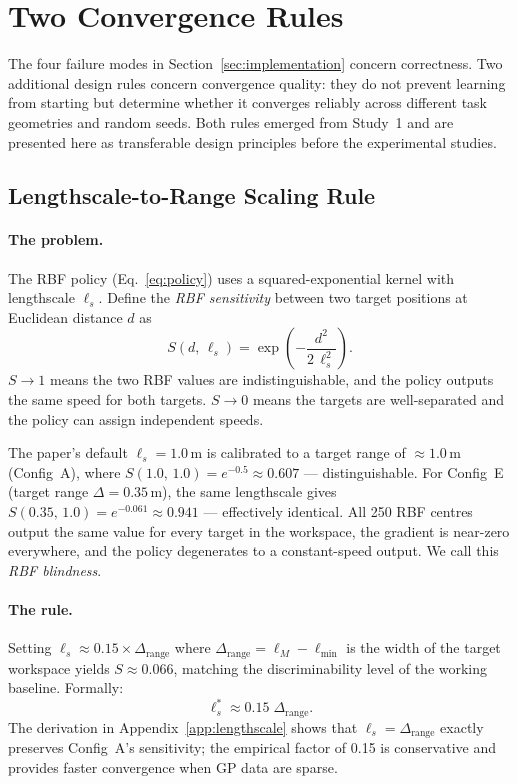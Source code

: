 \section{Two Convergence Rules}
\label{sec:convergence}

The four failure modes in Section~\ref{sec:implementation} concern correctness.
Two additional design rules concern convergence quality: they do not prevent learning
from starting but determine whether it converges reliably across different task
geometries and random seeds.
Both rules emerged from Study~1 and are presented here as transferable design
principles before the experimental studies.

\subsection{Lengthscale-to-Range Scaling Rule}
\label{sec:convergence:lengthscale}

\paragraph{The problem.}
The RBF policy (Eq.~\ref{eq:policy}) uses a squared-exponential kernel with
lengthscale $\ell_s$.
Define the \emph{RBF sensitivity} between two target positions at Euclidean
distance $d$ as
\begin{equation}
  S(d,\, \ell_s) = \exp\!\left( -\frac{d^2}{2\,\ell_s^2} \right).
  \label{eq:rbf_sensitivity}
\end{equation}
$S \to 1$ means the two RBF values are indistinguishable, and the policy outputs the
same speed for both targets.
$S \to 0$ means the targets are well-separated and the policy can assign independent
speeds.

The paper's default $\ell_s = 1.0$\,m is calibrated to a target range of
$\approx 1.0$\,m (Config~A), where $S(1.0,\, 1.0) = e^{-0.5} \approx 0.607$ —
distinguishable.
For Config~E (target range $\Delta = 0.35$\,m), the same lengthscale gives
$S(0.35,\, 1.0) = e^{-0.061} \approx 0.941$ — effectively identical.
All 250 RBF centres output the same value for every target in the workspace, the
gradient is near-zero everywhere, and the policy degenerates to a constant-speed output.
We call this \emph{RBF blindness}.

\paragraph{The rule.}
Setting $\ell_s \approx 0.15 \times \Delta_{\mathrm{range}}$ where
$\Delta_{\mathrm{range}} = \ell_M - \ell_{\min}$ is the width of the target workspace
yields $S \approx 0.066$, matching the discriminability level of the working baseline.
Formally:
\begin{equation}
  \ell_s^* \approx 0.15\;\Delta_{\mathrm{range}}.
  \label{eq:ls_rule}
\end{equation}
The derivation in Appendix~\ref{app:lengthscale} shows that $\ell_s = \Delta_{\mathrm{range}}$
exactly preserves Config~A's sensitivity; the empirical factor of 0.15 is conservative
and provides faster convergence when GP data are sparse.

